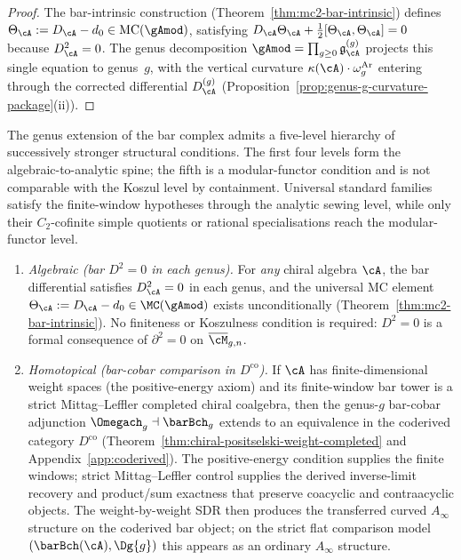 \begin{proof}
The bar-intrinsic construction
(Theorem~\ref{thm:mc2-bar-intrinsic}) defines
$\Theta_\cA := D_\cA - d_0 \in \mathrm{MC}(\gAmod)$,
satisfying $D_\cA\Theta_\cA +
\tfrac{1}{2}[\Theta_\cA,\Theta_\cA] = 0$ because $D_\cA^2 = 0$.
The genus decomposition $\gAmod = \prod_{g \geq 0}
\mathfrak{g}^{(g)}_\cA$ projects this single equation to genus~$g$,
with the vertical curvature $\kappa(\cA)\cdot\omega_g^{\mathrm{Ar}}$ entering
through the corrected differential $D^{(g)}_\cA$
(Proposition~\ref{prop:genus-g-curvature-package}\textup{(ii)}).
\end{proof}

\begin{theorem}
\label{thm:genus-extension-hierarchy}
The genus extension of the bar complex admits a five-level
hierarchy of successively stronger structural conditions.
The first four levels form the algebraic-to-analytic spine; the
fifth is a modular-functor condition and is not comparable with the
Koszul level by containment. Universal standard families satisfy the
finite-window hypotheses through the analytic sewing level, while
only their $C_2$-cofinite simple quotients or rational specialisations
reach the modular-functor level.
\begin{enumerate}[label=\textup{(\roman*)}]
\item \emph{Algebraic \textup{(}bar $D^2=0$ in each genus\textup{)}.}\;
 For \emph{any} chiral algebra $\cA$, the bar differential satisfies
 $D_\cA^2 = 0$ in each genus, and the universal MC element
 $\Theta_\cA := D_\cA - d_0 \in \MC(\gAmod)$ exists
 unconditionally
 \textup{(}Theorem~\textup{\ref{thm:mc2-bar-intrinsic})}.
 No finiteness or Koszulness condition is required: $D^2 = 0$
 is a formal consequence of $\partial^2 = 0$ on
 $\overline{\cM}_{g,n}$.

\item \emph{Homotopical \textup{(}bar-cobar comparison in
 $D^{\mathrm{co}}$\textup{)}.}\;
 If $\cA$ has finite-dimensional weight spaces
 \textup{(}the positive-energy axiom\textup{)} and its finite-window
 bar tower is a strict Mittag--Leffler completed chiral coalgebra,
 then the
 genus-$g$ bar-cobar adjunction
 $\Omegach_g \dashv \barBch_g$ extends to an equivalence
 in the coderived category $D^{\mathrm{co}}$
 \textup{(}Theorem~\textup{\ref{thm:chiral-positselski-weight-completed}}
 and Appendix~\textup{\ref{app:coderived})}.
 The positive-energy condition supplies the finite windows; strict
 Mittag--Leffler control supplies the derived inverse-limit recovery
 and product/sum exactness that preserve coacyclic and contraacyclic
 objects. The weight-by-weight SDR then produces the
 transferred curved $A_\infty$ structure on the coderived
 bar object; on the strict flat comparison model
 $(\barBch(\cA), \Dg{g})$ this appears as an ordinary
 $A_\infty$ structure.


\end{enumerate}
\end{theorem}
